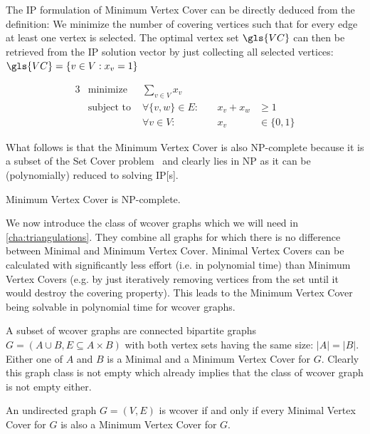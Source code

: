 The \gls{IP} formulation of Minimum Vertex Cover can be directly
deduced from the definition: We minimize the number of covering
vertices such that for every edge at least one vertex is selected. The
optimal vertex set \(\gls{VC}\) can then be retrieved from the
\gls{IP} solution vector by just collecting all selected vertices:
\( \gls{VC} = \{v \in V : x_v = 1\} \)

\begin{problem}
  \begin{alignat*}{3}
    &\text{minimize } & \sum\limits_{v \in V} x_v \\
    &\text{subject to } & \forall \{v,w\} \in E : &~& x_v + x_w &\geq 1 \\
    && \forall v \in V : &~& x_v &\in \{0,1\}
  \end{alignat*}
\end{problem}

What follows is that the Minimum Vertex Cover is also NP-complete
because it is a subset of the Set Cover
problem~\cite{karp_np_complete} and clearly lies in NP as it can be
(polynomially) reduced to solving \gls{IP}[s].

\begin{theorem}
  \label{thm:minimum_vertex_cover_complexity}
  Minimum Vertex Cover is NP-complete.~\cite{karp_np_complete}
\end{theorem}

We now introduce the class of \gls{wcover} graphs which we will need
in \cref{cha:triangulations}. They combine all graphs for which there
is no difference between Minimal and Minimum Vertex Cover. Minimal
Vertex Covers can be calculated with significantly less effort (i.e. 
in polynomial time) than Minimum Vertex Covers (e.g. by just
iteratively removing vertices from the set until it would destroy the
covering property). This leads to the Minimum Vertex Cover being solvable
in polynomial time for \gls{wcover} graphs.

A subset of \gls{wcover} graphs are connected bipartite graphs
\(G=(A \cup B,E \subseteq A \times B)\) with both vertex sets having
the same size: \(|A|=|B|\). Either one of \(A\) and \(B\) is a Minimal
and a Minimum Vertex Cover for \(G\). Clearly this graph class is not
empty which already implies that the class of \gls{wcover} graph is
not empty either.

\begin{definition}
  \label{def:well_covered}
  An undirected graph \(G=(V,E)\) is \gls{wcover} if and only if every
  Minimal Vertex Cover for \(G\) is also a Minimum Vertex Cover for \(G\).
  \cite{graph_well_covered}
\end{definition}

